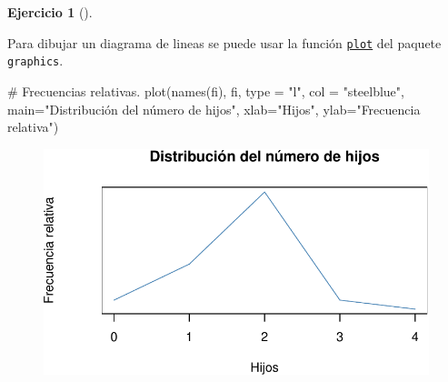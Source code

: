\documentclass[
  a4paper,
]{scrreport}
\newenvironment{Shaded}{\begin{snugshade}}{\end{snugshade}}
\newcommand{\AttributeTok}[1]{\textcolor[rgb]{0.40,0.45,0.13}{#1}}
\newcommand{\CommentTok}[1]{\textcolor[rgb]{0.37,0.37,0.37}{#1}}
\newcommand{\FunctionTok}[1]{\textcolor[rgb]{0.28,0.35,0.67}{#1}}
\newcommand{\NormalTok}[1]{\textcolor[rgb]{0.00,0.23,0.31}{#1}}
\newcommand{\StringTok}[1]{\textcolor[rgb]{0.13,0.47,0.30}{#1}}
\theoremstyle{definition}
\newtheorem{exercise}{Ejercicio}[chapter]
\theoremstyle{remark}
\begin{document}
\begin{exercise}[]
\begin{enumerate}
\begin{tcolorbox}
  Para dibujar un diagrama de lineas se puede usar la función
  \href{https://www.rdocumentation.org/packages/graphics/versions/3.6.2/topics/plot}{\texttt{plot}}
  del paquete \texttt{graphics}.

\begin{Shaded}
\begin{Highlighting}[]
\CommentTok{\# Frecuencias relativas.}
\FunctionTok{plot}\NormalTok{(}\FunctionTok{names}\NormalTok{(fi), fi, }\AttributeTok{type =} \StringTok{"l"}\NormalTok{, }\AttributeTok{col =} \StringTok{"steelblue"}\NormalTok{, }\AttributeTok{main=}\StringTok{"Distribución del número de hijos"}\NormalTok{, }\AttributeTok{xlab=}\StringTok{"Hijos"}\NormalTok{, }\AttributeTok{ylab=}\StringTok{"Frecuencia relativa"}\NormalTok{)}
\end{Highlighting}
\end{Shaded}

  \begin{figure}[H]

  {\centering \includegraphics{03-frecuencias-graficos_files/figure-pdf/unnamed-chunk-8-1.pdf}

  }

  \end{figure}

  \end{tcolorbox}

  \begin{tcolorbox}[enhanced jigsaw, coltitle=black, left=2mm, colback=white, leftrule=.75mm, toptitle=1mm, breakable, bottomrule=.15mm, titlerule=0mm, bottomtitle=1mm, title=\textcolor{quarto-callout-tip-color}{\faLightbulb}\hspace{0.5em}{Solución 2}, arc=.35mm, toprule=.15mm, rightrule=.15mm, colframe=quarto-callout-tip-color-frame, opacityback=0, colbacktitle=quarto-callout-tip-color!10!white, opacitybacktitle=0.6]


\end{tcolorbox}
\end{enumerate}
\end{exercise}
\end{document}
